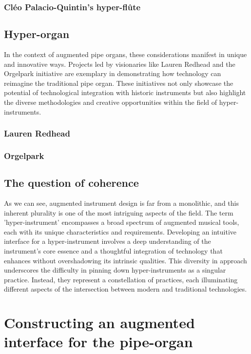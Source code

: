 \documentclass[12pt,twoside,maitrise]{dms}
\theoremstyle{definition}
\begin{document}
\subsection{Cléo Palacio-Quintin's hyper-flûte}

\section{Hyper-organ}

In the context of augmented pipe organs, these considerations manifest in unique and innovative ways.
Projects led by visionaries like Lauren Redhead and the Orgelpark initiative are exemplary in demonstrating how technology can reimagine the traditional pipe organ.
These initiatives not only showcase the potential of technological integration with historic instruments but also highlight the diverse methodologies and creative opportunities within the field of hyper-instruments.

\subsection{Lauren Redhead}

\subsection{Orgelpark}

\section{The question of coherence}

As we can see, augmented instrument design is far from a monolithic, and this inherent plurality is one of the most intriguing aspects of the field.
The term 'hyper-instrument' encompasses a broad spectrum of augmented musical tools, each with its unique characteristics and requirements.
Developing an intuitive interface for a hyper-instrument involves a deep understanding of the instrument's core essence and a thoughtful integration of technology that enhances without overshadowing its intrinsic qualities.
This diversity in approach underscores the difficulty in pinning down hyper-instruments as a singular practice.
Instead, they represent a constellation of practices, each illuminating different aspects of the intersection between modern and traditional technologies.

\chapter{Constructing an augmented interface for the pipe-organ}
\end{document}
